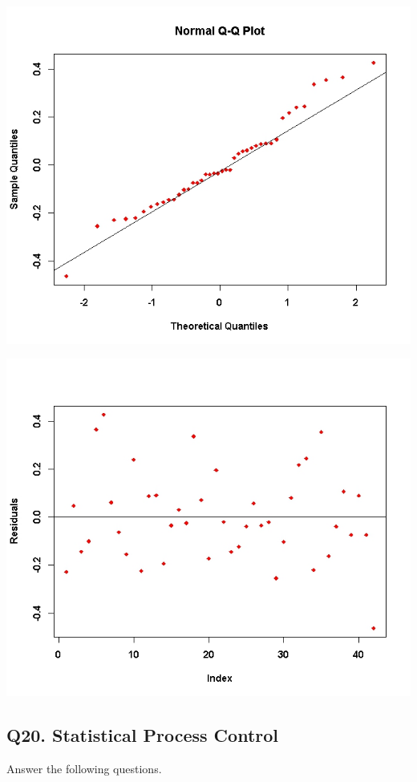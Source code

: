 \documentclass[a4paper,12pt]{article}
\begin{document}
\begin{center}
	\includegraphics[scale=0.55]{images/ExamQ5qqplot}
\end{center}
\begin{center}
	\includegraphics[scale=0.55]{images/ExamQ5resid}
\end{center}
\newpage

\subsection*{Q20. Statistical Process Control}
Answer the following questions.
\end{document}
